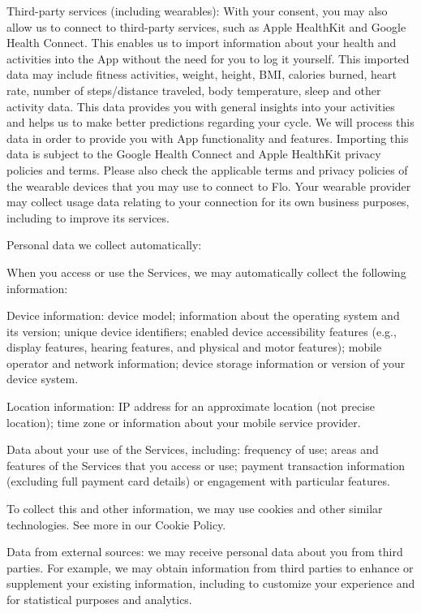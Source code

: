 Third-party services (including wearables): With your consent, you may also allow us to connect to third-party services, such as Apple HealthKit and Google Health Connect. This enables us to import information about your health and activities into the App without the need for you to log it yourself. This imported data may include fitness activities, weight, height, BMI, calories burned, heart rate, number of steps/distance traveled, body temperature, sleep and other activity data. This data provides you with general insights into your activities and helps us to make better predictions regarding your cycle. We will process this data in order to provide you with App functionality and features. Importing this data is subject to the Google Health Connect and Apple HealthKit privacy policies and terms. Please also check the applicable terms and privacy policies of the wearable devices that you may use to connect to Flo. Your wearable provider may collect usage data relating to your connection for its own business purposes, including to improve its services. 

Personal data we collect automatically:

When you access or use the Services, we may automatically collect the following information:

Device information: device model; information about the operating system and its version; unique device identifiers; enabled device accessibility features (e.g., display features, hearing features, and physical and motor features); mobile operator and network information; device storage information or version of your device system. 

Location information: IP address for an approximate location (not precise location); time zone or information about your mobile service provider.

Data about your use of the Services, including: frequency of use; areas and features of the Services that you access or use; payment transaction information (excluding full payment card details) or engagement with particular features.

To collect this and other information, we may use cookies and other similar technologies. See more in our Cookie Policy.

Data from external sources: we may receive personal data about you from third parties. For example, we may obtain information from third parties to enhance or supplement your existing information, including to customize your experience and for statistical purposes and analytics.

